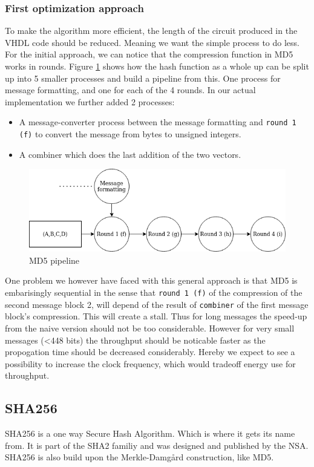 \documentclass[a4paper]{article}
\begin{document}
\subsubsection{First optimization approach}
\label{sec:orgc65f302}
To make the algorithm more efficient, the length of the circuit produced in the VHDL code should be reduced. Meaning we want the simple process to do less. For the initial approach, we can notice that the compression function in MD5 works in rounds. Figure \ref{fig:MD5opt1} shows how the hash function as a whole up can be split up into 5 smaller processes and build a pipeline from this. One process for message formatting, and one for each of the 4 rounds. In our actual implementation we further added 2 processes:
\begin{itemize}
\item A message-converter process between the message formatting and \texttt{round 1 (f)} to convert the message from bytes to unsigned integers.
\item A combiner which does the last addition of the two vectors.
\end{itemize}

\begin{figure}[H]
\centering
\includegraphics[width=.9\linewidth]{./Implementation/md5.png}
\caption{\label{fig:MD5opt1}MD5 pipeline}
\end{figure}
One problem we however have faced with this general approach is that MD5 is embarisingly sequential in the sense that \texttt{round 1 (f)} of the compression of the second message block 2, will depend of the result of \texttt{combiner} of the first message block's compression. This will create a stall. Thus for long messages the speed-up from the naive version should not be too considerable. However for very small messages (<448 bits) the throughput should be noticable faster as the propogation time should be decreased considerably. Hereby we expect to see a possibility to increase the clock frequency, which would tradeoff energy use for throughput.
\subsection{SHA256}
\label{sec:org3401039}
SHA256 is a one way Secure Hash Algorithm. Which is where it gets its name from.
It is part of the SHA2 familiy and was designed and published by the NSA.
SHA256 is also build upon the Merkle-Damgård construction, like MD5.
\end{document}
